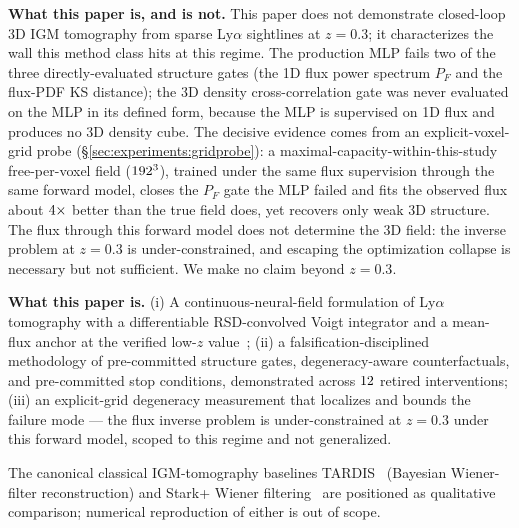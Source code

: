 \textbf{What this paper is, and is not.} This paper does not demonstrate closed-loop 3D IGM tomography from sparse Ly$\alpha$ sightlines at $z = 0.3$; it characterizes the wall this method class hits at this regime. The production MLP fails two of the three directly-evaluated structure gates (the 1D flux power spectrum $P_F$ and the flux-PDF KS distance); the 3D density cross-correlation gate was never evaluated on the MLP in its defined form, because the MLP is supervised on 1D flux and produces no 3D density cube. The decisive evidence comes from an explicit-voxel-grid probe (\S\ref{sec:experiments:gridprobe}): a maximal-capacity-within-this-study free-per-voxel field ($192^3$), trained under the same flux supervision through the same forward model, closes the $P_F$ gate the MLP failed and fits the observed flux about $4\times$ better than the true field does, yet recovers only weak 3D structure. The flux through this forward model does not determine the 3D field: the inverse problem at $z = 0.3$ is under-constrained, and escaping the optimization collapse is necessary but not sufficient. We make no claim beyond $z = 0.3$.

\textbf{What this paper is.} (i) A continuous-neural-field formulation of Ly$\alpha$ tomography with a differentiable RSD-convolved Voigt integrator and a mean-flux anchor at the verified low-$z$ value~\cite{kirkman2007}; (ii) a falsification-disciplined methodology of pre-committed structure gates, degeneracy-aware counterfactuals, and pre-committed stop conditions, demonstrated across $12$ retired interventions; (iii) an explicit-grid degeneracy measurement that localizes and bounds the failure mode --- the flux inverse problem is under-constrained at $z = 0.3$ under this forward model, scoped to this regime and not generalized.

The canonical classical IGM-tomography baselines TARDIS~\cite{horowitz2019tardis} (Bayesian Wiener-filter reconstruction) and Stark+ Wiener filtering~\cite{stark2015tomography} are positioned as qualitative comparison; numerical reproduction of either is out of scope.
